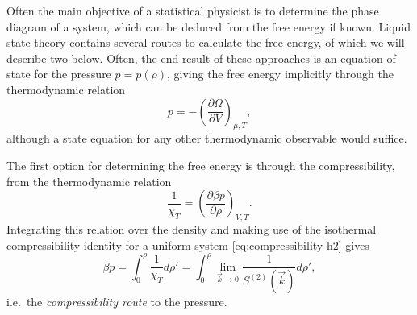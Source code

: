 Often the main objective of a statistical physicist is to determine the phase diagram of a system, which can be deduced from the free energy if known.
Liquid state theory contains several routes to calculate the free energy, of which we will describe two below.
Often, the end result of these approaches is an equation of state for the pressure $p = p(\rho)$, giving the free energy implicitly through the thermodynamic relation
\begin{equation}\label{eq:pressure-relation-1}
  p
  =
  - \left( \frac{\partial \Omega}{\partial V} \right)_{\mu,T},
\end{equation}
although a state equation for any other thermodynamic observable would suffice.

The first option for determining the free energy is through the compressibility, from the thermodynamic relation
\begin{equation}
  \frac{1}{\chi_T}
  =
  \left( \frac{\partial \beta p}{\partial \rho} \right)_{V,T}.
\end{equation}
Integrating this relation over the density and making use of the isothermal compressibility identity for a uniform system \eqref{eq:compressibility-h2} gives
\begin{equation}\label{eq:compressibility-route-pressure}
  \beta p
  =
  \int_0^\rho \frac{1}{\chi_T} d\rho'
  =
  \int_0^\rho \lim_{\vec{k} \to 0} \frac{1}{S^{(2)}(\vec{k})} d\rho',
\end{equation}
i.e.\ the \emph{compressibility route} to the pressure.

